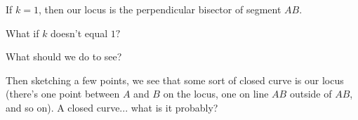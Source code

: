 










If $k=1$, then our locus is the perpendicular bisector of segment $AB$.

What if $k$ doesn't equal $1?$

What should we do to see?







Then sketching a few points, we see that some sort of closed curve is our locus (there's one point between $A$ and $B$ on the locus, one on line $AB$ outside of $AB$, and so on). A closed curve... what is it probably?

